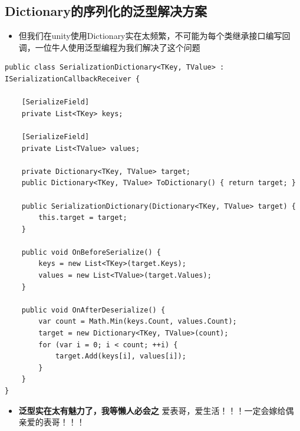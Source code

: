 \documentclass[9pt, b5paper]{article}
\begin{document}
\subsection{Dictionary的序列化的泛型解决方案}
\label{sec-31-2}
\begin{itemize}
\item 但我们在unity使用Dictionary实在太频繁，不可能为每个类继承接口编写回调，一位牛人使用泛型编程为我们解决了这个问题
\end{itemize}
\begin{verbatim}
public class SerializationDictionary<TKey, TValue> : ISerializationCallbackReceiver {

    [SerializeField]
    private List<TKey> keys;

    [SerializeField]
    private List<TValue> values;

    private Dictionary<TKey, TValue> target;
    public Dictionary<TKey, TValue> ToDictionary() { return target; }

    public SerializationDictionary(Dictionary<TKey, TValue> target) {
        this.target = target;
    }

    public void OnBeforeSerialize() {
        keys = new List<TKey>(target.Keys);
        values = new List<TValue>(target.Values);
    }

    public void OnAfterDeserialize() {
        var count = Math.Min(keys.Count, values.Count);
        target = new Dictionary<TKey, TValue>(count);
        for (var i = 0; i < count; ++i) {
            target.Add(keys[i], values[i]);
        }
    }
}
\end{verbatim}
\begin{itemize}
\item \textbf{泛型实在太有魅力了，我等懒人必会之} 爱表哥，爱生活！！！一定会嫁给偶亲爱的表哥！！！
\end{itemize}
\end{document}
